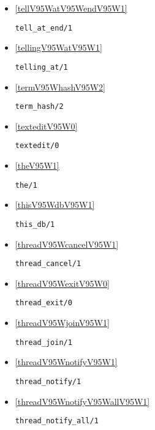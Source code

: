 \begin{itemize}
\item \ref{tellV95WatV95WendV95W1} 
\begin{verbatim}
tell_at_end/1
\end{verbatim}

\item \ref{tellingV95WatV95W1} 
\begin{verbatim}
telling_at/1
\end{verbatim}

\item \ref{termV95WhashV95W2} 
\begin{verbatim}
term_hash/2
\end{verbatim}

\item \ref{texteditV95W0} 
\begin{verbatim}
textedit/0
\end{verbatim}

\item \ref{theV95W1} 
\begin{verbatim}
the/1
\end{verbatim}

\item \ref{thisV95WdbV95W1} 
\begin{verbatim}
this_db/1
\end{verbatim}

\item \ref{threadV95WcancelV95W1} 
\begin{verbatim}
thread_cancel/1
\end{verbatim}

\item \ref{threadV95WexitV95W0} 
\begin{verbatim}
thread_exit/0
\end{verbatim}

\item \ref{threadV95WjoinV95W1} 
\begin{verbatim}
thread_join/1
\end{verbatim}

\item \ref{threadV95WnotifyV95W1} 
\begin{verbatim}
thread_notify/1
\end{verbatim}

\item \ref{threadV95WnotifyV95WallV95W1} 
\begin{verbatim}
thread_notify_all/1
\end{verbatim}


\end{itemize}
